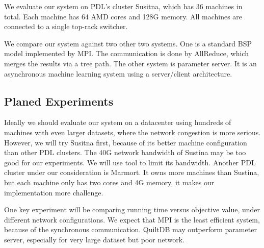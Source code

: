 \documentclass{acm_proc_article-sp}
\begin{document}
We evaluate our system on PDL's cluster Susitna, which has 36 machines in
total. Each machine has 64 AMD cores and 128G memory. All machines are connected
to a single top-rack switcher.

We compare our system against two other two systems. One is a standard BSP
model implemented by MPI. The communication is done by AllReduce, which merges
the results via a tree path. The other system is parameter server. It is an
asynchronous machine learning system using a server/client architecture.

\subsection{Planed Experiments}

Ideally we should evaluate our system on a datacenter using hundreds of
machines with even larger datasets, where the network congestion is more
serious. However, we will try Susitna first, because of its better machine
configuration than other PDL clusters. The 40G network bandwidth of Sustina may
be too good for our experiments. We will use tool to limit its
bandwidth. Another PDL cluster under our consideration is Marmort. It owns more
machines than Sustina, but each machine only has two cores and 4G memory, it
makes our implementation more challenge.

One key experiment will be comparing running time versus objective value, under
different network configurations. We expect that MPI is the least efficient
system, because of the synchronous communication. QuiltDB may outperform
parameter server, especially for very large dataset but poor network.




\end{document}
